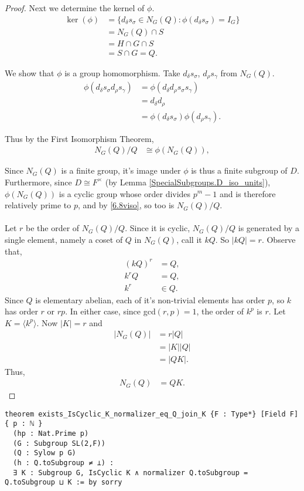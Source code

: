 \begin{proof}
Next we determine the kernel of $\phi$.
\begin{align*} \ker(\phi) &= \{ d_\delta s_\sigma \in N_G(Q) : \phi(d_\delta s_\sigma) = I_G \}
\\ &= N_G(Q) \cap S
\\ &= H \cap G \cap S %
\\ &= S \cap G = Q. %
\end{align*}

We show that $\phi$ is a group homomorphism. Take $d_\delta s_\sigma$, $d_\rho s_\gamma$ from $ N_G(Q)$.
\begin{align*} \phi(d_\delta s_\sigma d_\rho s_\gamma) &= \phi(d_\delta d_\rho s_\sigma s_\gamma) %
\\ &= d_\delta d_\rho
\\ &= \phi(d_\delta s_\sigma) \phi(d_\rho s_\gamma).
\end{align*}

Thus by the First Isomorphism Theorem,
\begin{align}\label{6.8viso} N_G(Q) / Q &\cong \phi(N_G(Q)),
\end{align}

Since $N_G(Q)$ is a finite group, it's image under $\phi$ is thus a finite subgroup of $D$. Furthermore, since $D \cong F^\times$ (by Lemma \ref{SpecialSubgroups.D_iso_units}), $\phi(N_G(Q))$ is a cyclic group whose order divides $p^m-1$ and is therefore relatively prime to $p$, and by \eqref{6.8viso}, so too is $N_G(Q) / Q$. \\
\\
Let $r$ be the order of $N_G(Q) / Q$. Since it is cyclic, $N_G(Q)/Q$ is generated by a single element, namely a coset of $Q$ in $N_G(Q)$, call it $kQ$. So $|kQ| = r$. Observe that,
\begin{align*} (kQ)^r &= Q,
\\ k^rQ &= Q,
\\ k^r &\in Q.
\end{align*}
Since $Q$ is elementary abelian, each of it's non-trivial elements has order $p$, so $k$ has order $r$ or $rp$. In either case, since gcd$(r,p)=1$, the order of $k^p$ is $r$. Let $K = \langle k^p \rangle$. Now $|K| = r$ and
\begin{align*} |N_G(Q)| &= r|Q|
\\ &= |K||Q|
\\ &= |QK|. \tag{since $Q \cap K = I_G$} 
\end{align*}
Thus,
\begin{align}\label{QK} N_G(Q) &= QK.
\end{align}
\end{proof}
\begin{footnotesize}
\begin{verbatim}
theorem exists_IsCyclic_K_normalizer_eq_Q_join_K {F : Type*} [Field F] { p : ℕ }
  (hp : Nat.Prime p)
  (G : Subgroup SL(2,F))
  (Q : Sylow p G)
  (h : Q.toSubgroup ≠ ⊥) :
  ∃ K : Subgroup G, IsCyclic K ∧ normalizer Q.toSubgroup = Q.toSubgroup ⊔ K := by sorry
\end{verbatim}
\end{footnotesize}



